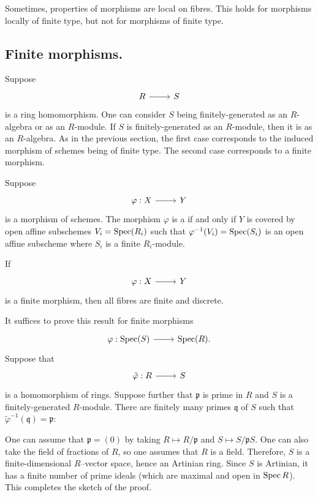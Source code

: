 \documentclass [11 pt, oneside] {article}
\begin{document}
\begin{remark}
	Sometimes, properties of morphisms are local on fibres. This holds for morphisms locally of finite type, but not for morphisms of finite type.
\end{remark}

\subsection{Finite morphisms.}
Suppose 
\[
\begin{tikzcd}
R\ar[r]& S
\end{tikzcd}
\]
is a ring homomorphism. One can consider $S$ being finitely-generated as an $R$-algebra or as an $R$-module. If $S$ is finitely-generated as an $R$-module, then it is as an $R$-algebra. As in the previous section, the first case corresponds to the induced morphism of schemes being of finite type. The second case corresponds to a finite morphism.

Suppose 
\[
\begin{tikzcd}
\varphi:X\ar[r]&Y
\end{tikzcd}
\] 
is a morphism of schemes. The morphism $\varphi$ is a  if and only if $Y$ is covered by open affine subschemes $V_i = \operatorname{Spec} (R_i)$ such that $\varphi^{-1}(V_i) =\operatorname{Spec} (S_i)$ is an open affine subscheme where $S_i$ is a finite $R_i$-module. 

\begin{proposition}
If 
\[
\begin{tikzcd}
\varphi:X\ar[r]&Y
\end{tikzcd}
\]
is a finite morphism, then all fibres are finite and discrete.
\end{proposition}

It suffices to prove this result for finite morphisms 
\[
\begin{tikzcd}
\varphi: \Spec (S)\ar[r]& \Spec (R).
\end{tikzcd}
\] 
Suppose that
\[
\begin{tikzcd}
\tilde\varphi :R\ar[r]& S
\end{tikzcd}
\] 
is a homomorphism of rings. Suppose further that $\mathfrak{p}$ is prime in $R$ and $S$ is a finitely-generated $R$-module. There are finitely many primes $\mathfrak{q}$ of $S$ such that $\tilde\varphi^{-1}(\mathfrak{q})=\mathfrak{p}$: 

One can assume that $\mathfrak{p}=(0)$ by taking $R \longmapsto R/\mathfrak{p}$ and $S\longmapsto S/\mathfrak{p}S$. One can also take the field of fractions of $R$, so one assumes that $R$ is a field. Therefore, $S$ is a finite-dimensional $R$--vector space, hence an Artinian ring. Since $S$ is Artinian, it has a finite number of prime ideals (which are maximal and open in $\operatorname{Spec} R$). This completes the sketch of the proof.
\end{document}
